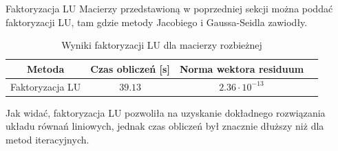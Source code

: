 \documentclass{article}
\begin{document}
\begin{section}{Faktoryzacja LU}
    Macierzy przedstawioną w poprzedniej sekcji można poddać faktoryzacji LU, tam gdzie metody Jacobiego i Gaussa-Seidla
    zawiodły.
    \begin{table}[H]
        \centering
        \begin{tabular}{|c|c|c|c|}
            \hline
            Metoda & Czas obliczeń [s] & Norma wektora residuum \\
            \hline
            Faktoryzacja LU & $39.13$ & $2.36\cdot10^{-13}$ \\
            \hline
        \end{tabular}
        \caption{Wyniki faktoryzacji LU dla macierzy rozbieżnej}
    \end{table}
    Jak widać, faktoryzacja LU pozwoliła na uzyskanie dokładnego rozwiązania układu równań liniowych, jednak
    czas obliczeń był znacznie dłuższy niż dla metod iteracyjnych.
\end{section}
\end{document}
